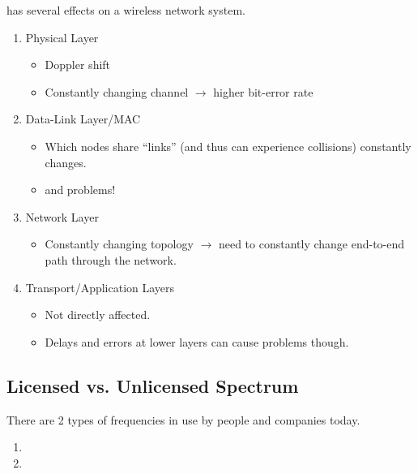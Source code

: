  has several effects on a wireless network system.
\begin{enumerate}[noitemsep]
\item Physical Layer
  \begin{itemize}[noitemsep]
  \item Doppler shift
  \item Constantly changing channel $\rightarrow$ higher bit-error rate
  \end{itemize}

\item Data-Link Layer/MAC
  \begin{itemize}[noitemsep]
  \item Which nodes share “links” (and thus can experience collisions) constantly changes.
  \item {} and  problems!
  \end{itemize}

\item Network Layer
  \begin{itemize}[noitemsep]
  \item Constantly changing topology $\rightarrow$ need to constantly change end-to-end path through the network.
  \end{itemize}

\item Transport/Application Layers
  \begin{itemize}[noitemsep]
  \item Not directly affected.
  \item Delays and errors at lower layers can cause problems though.
  \end{itemize}
\end{enumerate}

\subsection{Licensed vs. Unlicensed Spectrum}\label{subsec:Licensed_vs_Unlicensed}
There are 2 types of frequencies in use by people and companies today.
\begin{enumerate}[noitemsep]
\item {}
\item {}
\end{enumerate}

